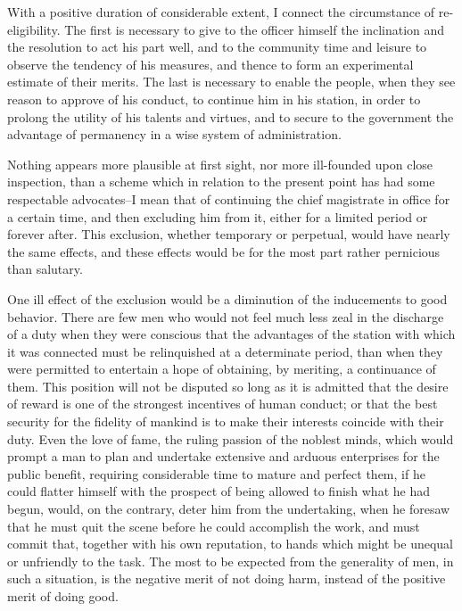 With a positive duration of considerable extent, I connect the circumstance of re-eligibility. 
The first is necessary to give to the officer himself the inclination and the resolution to act his part well, and to the community time and leisure to observe the tendency of his measures, and thence to form an experimental estimate of their merits. 
The last is necessary to enable the people, when they see reason to approve of his conduct, to continue him in his station, in order to prolong the utility of his talents and virtues, and to secure to the government the advantage of permanency in a wise system of administration.

Nothing appears more plausible at first sight, nor more ill-founded upon close inspection, than a scheme which in relation to the present point has had some respectable advocates--I mean that of continuing the chief magistrate in office for a certain time, and then excluding him from it, either for a limited period or forever after. 
This exclusion, whether temporary or perpetual, would have nearly the same effects, and these effects would be for the most part rather pernicious than salutary.

One ill effect of the exclusion would be a diminution of the inducements to good behavior. 
There are few men who would not feel much less zeal in the discharge of a duty when they were conscious that the advantages of the station with which it was connected must be relinquished at a determinate period, than when they were permitted to entertain a hope of obtaining, by meriting, a continuance of them. 
This position will not be disputed so long as it is admitted that the desire of reward is one of the strongest incentives of human conduct; or that the best security for the fidelity of mankind is to make their interests coincide with their duty. 
Even the love of fame, the ruling passion of the noblest minds, which would prompt a man to plan and undertake extensive and arduous enterprises for the public benefit, requiring considerable time to mature and perfect them, if he could flatter himself with the prospect of being allowed to finish what he had begun, would, on the contrary, deter him from the undertaking, when he foresaw that he must quit the scene before he could accomplish the work, and must commit that, together with his own reputation, to hands which might be unequal or unfriendly to the task. 
The most to be expected from the generality of men, in such a situation, is the negative merit of not doing harm, instead of the positive merit of doing good.

